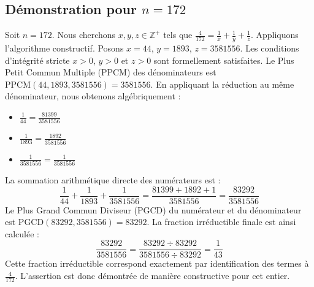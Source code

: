 \documentclass[11pt,a4paper]{article}
\begin{document}
\subsection{Démonstration pour $n = 172$}
Soit $n = 172$. Nous cherchons $x, y, z \in \mathbb{Z}^{+}$ tels que $\frac{4}{172} = \frac{1}{x} + \frac{1}{y} + \frac{1}{z}$.
Appliquons l'algorithme constructif. Posons $x = 44$, $y = 1893$, $z = 3581556$.
Les conditions d'intégrité stricte $x > 0$, $y > 0$ et $z > 0$ sont formellement satisfaites.
Le Plus Petit Commun Multiple (PPCM) des dénominateurs est $\text{PPCM}(44, 1893, 3581556) = 3581556$.
En appliquant la réduction au même dénominateur, nous obtenons algébriquement :
\begin{itemize}
    \item $\frac{1}{44} = \frac{81399}{3581556}$
    \item $\frac{1}{1893} = \frac{1892}{3581556}$
    \item $\frac{1}{3581556} = \frac{1}{3581556}$
\end{itemize}
La sommation arithmétique directe des numérateurs est :
$$ \frac{1}{44} + \frac{1}{1893} + \frac{1}{3581556} = \frac{81399 + 1892 + 1}{3581556} = \frac{83292}{3581556} $$
Le Plus Grand Commun Diviseur (PGCD) du numérateur et du dénominateur est $\text{PGCD}(83292, 3581556) = 83292$.
La fraction irréductible finale est ainsi calculée :
$$ \frac{83292}{3581556} = \frac{83292 \div 83292}{3581556 \div 83292} = \frac{1}{43} $$
Cette fraction irréductible correspond exactement par identification des termes à $\frac{4}{172}$. L'assertion est donc démontrée de manière constructive pour cet entier.
\end{document}
